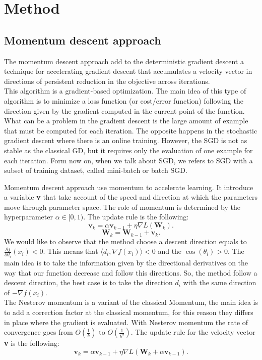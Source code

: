 \section{Method}

\subsection{Momentum descent approach}
The momentum descent approach add to the deterministic gradient descent a technique for accelerating gradient descent that accumulates a velocity vector in directions of persistent reduction in the objective across iterations. 
\\
This algorithm is a gradient-based optimization. The main idea of this type of algorithm is to minimize a loss function (or cost/error function) following the direction given by the gradient computed in the current point of the function.
\\
What can be a problem in the gradient descent is the large amount of example that must be computed for each iteration. The opposite happens in the stochastic gradient descent where there is an online training. However, the SGD is not as stable as the classical GD, but it requires only the evaluation of one example for each iteration. 
Form now on, when we talk about SGD, we refers to SGD with a subset of training dataset, called mini-batch or batch SGD.

Momentum descent approach use momentum to accelerate learning. It introduce a variable \textbf{v} that take account of the speed and direction at which the parameters move through parameter space. The role of momentum is determined by the hyperparameter $\alpha\in[0,1)$.
The update rule is the following:
\begin{equation}
\label{classical_momentum}
\textbf{v}_k = \alpha\textbf{v}_{k-1} + \eta\nabla\textit{L}(\textbf{W}_k).
\end{equation}
\begin{equation}
\label{update_momentum}
\textbf{W}_k = \textbf{W}_{k-1}  + \textbf{v}_k.
\end{equation}
We would like to observe that the method choose a descent direction equals to $\frac{\partial f}{\partial d_i}(x_i)<0$. This means that $\langle d_i, \nabla f(x_i)\rangle <0$ and the $\cos(\theta_i)>0$. The main idea is to take the information given by the directional derivatives on the way that our function decrease and follow this directions. So, the method follow a descent direction, the best case is to take the direction $d_i$ with the same direction of $-\nabla f(x_i)$.\\
The Nesterov momentum is a variant of the classical Momentum, the main idea is to add a correction factor at the classical momentum,  for this reason they differs in place where the gradient is evaluated. With Nesterov momentum the rate of convergence goes from $O(\frac{1}{k})$ to $O(\frac{1}{k^2})$.
The update rule for the velocity vector \textbf{v} is the following:
\begin{equation}
\label{nesterov_momentum}
\textbf{v}_k = \alpha\textbf{v}_{k-1} + \eta\nabla\textit{L}(\textbf{W}_k + \alpha\textbf{v}_{k-1}).
\end{equation}

